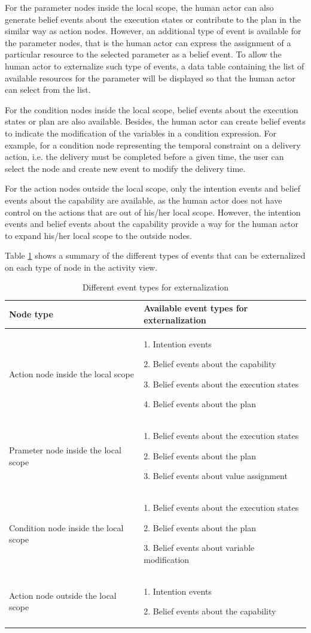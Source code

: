 For the parameter nodes inside the local scope, the human actor can also generate belief events about the execution states or contribute to the plan in the similar way as action nodes. However, an additional type of event is available for the parameter nodes, that is the human actor can express the assignment of a particular resource to the selected parameter as a belief event. To allow the human actor to externalize such type of events, a data table containing the list of available resources for the parameter will be displayed so that the human actor can select from the list.

For the condition nodes inside the local scope, belief events about the execution states or plan are also available. Besides, the human actor can create belief events to indicate the modification of the variables in a condition expression. For example, for a condition node representing the temporal constraint on a delivery action, i.e. the delivery must be completed before a given time, the user can select the node and create new event to modify the delivery time. 

For the action nodes outside the local scope, only the intention events and belief events about the capability are available, as the human actor does not have control on the actions that are out of his/her local scope. However, the intention events and belief events about the capability provide a way for the human actor to expand his/her local scope to the outside nodes.

Table \ref{tab:event_types_for_externalization} shows a summary of the different types of events that can be externalized on each type of node in the activity view. 


\begin{table}[htbp]
\centering
\footnotesize
\begin{tabular}{>{\raggedright}p{1.5in}>{\raggedright}p{2.6in}}
\toprule 
\textbf{Node type} & \textbf{Available event types for externalization}\tabularnewline
\midrule 
Action node inside the local scope & 1. Intention events

2. Belief events about the capability

3. Belief events about the execution states

4. Belief events about the plan\tabularnewline
\midrule 
Prameter node inside the local scope & 1. Belief events about the execution states

2. Belief events about the plan

3. Belief events about value assignment\tabularnewline
\midrule 
Condition node inside the local scope & 1. Belief events about the execution states

2. Belief events about the plan

3. Belief events about variable modification\tabularnewline
\midrule 
Action node outside the local scope & 1. Intention events

2. Belief events about the capability\tabularnewline
\bottomrule
\end{tabular}	
\caption{Different event types for externalization}
\label{tab:event_types_for_externalization}
\end{table}

